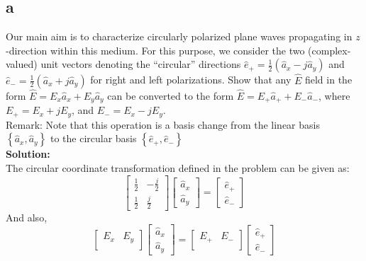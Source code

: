 \documentclass[11pt]{amsart}
\begin{document}
\subsection*{a}
Our main aim is to characterize circularly polarized plane waves propagating in $z$-direction within this medium. For this purpose, we consider the two (complex-valued) unit vectors denoting the “circular” directions $\hat{e}_+ = \frac{1}{2}(\hat{a}_x-j\hat{a}_y)$ and $\hat{e}_- = \frac{1}{2}(\hat{a}_x + j \hat{a}_y)$ for right
and left polarizations. Show that any $\hat{E}$ field in the form $\hat{E}=E_x \hat{a}_x + E_y \hat{a}_y $ can be
converted to the form $\hat{E}=E_+ \hat{a}_+ + E_- \hat{a}_- $, where $E_+=E_x + j E_y$, and $E_-=E_x - j E_y$.
\\
Remark: Note that this operation is a basis change from the linear basis $\left \{ \hat{a}_x ,\hat{a}_y \right \}$ to the circular basis $\left \{ \hat{e}_+ ,\hat{e}_- \right \}$
\\
\textbf{Solution:}\\
The circular coordinate transformation defined in the problem can be given as:
\begin{equation}
\label{eq:1}
\begin{bmatrix}
 \frac{1}{2} & -\frac{j}{2} \\ 
\frac{1}{2} &  \frac{j}{2}
\end{bmatrix}
\begin{bmatrix}
 \hat{a}_x  \\ 
\hat{a}_y
\end{bmatrix}
=
\begin{bmatrix}
 \hat{e}_+ \\ 
\hat{e}_-
\end{bmatrix}
\end{equation}
And also,
\begin{equation}
\label{eq:2}
\begin{bmatrix}
 E_x &  E_y \\ 
\end{bmatrix}
\begin{bmatrix}
 \hat{a}_x  \\ 
\hat{a}_y
\end{bmatrix}
=
\begin{bmatrix}
 E_+ &  E_- \\ 
\end{bmatrix}
\begin{bmatrix}
 \hat{e}_+ \\ 
\hat{e}_-
\end{bmatrix}
\end{equation}
\end{document}
